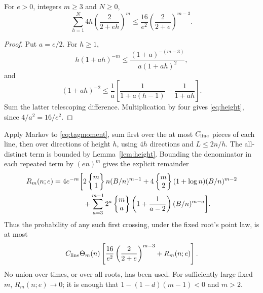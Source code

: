 \begin{lemma}\label{lem:height}
For \(e>0\), integers \(m\ge3\) and \(N\ge0\),
\begin{equation}\label{eq:height}
 \sum_{h=1}^N4h\left(\frac2{2+eh}\right)^m
 \le\frac{16}{e^2}\left(\frac2{2+e}\right)^{m-3}.
\end{equation}
\end{lemma}
\begin{proof}
Put \(a=e/2\). For \(h\ge1\),
\[
 h(1+ah)^{-m}\le\frac{(1+a)^{-(m-3)}}{a(1+ah)^2},
\]
and
\[
 (1+ah)^{-2}\le\frac1a
 \left[\frac1{1+a(h-1)}-\frac1{1+ah}\right].
\]
Sum the latter telescoping difference. Multiplication by four
gives \eqref{eq:height}, since \(4/a^2=16/e^2\).
\end{proof}

Apply Markov to \eqref{eq:tagmoment}, sum first over the at most
\(C_{\rm line}\) pieces of each line, then over directions of
height \(h\), using \(4h\) directions and \(L\le2n/h\).
The all-distinct term is bounded by Lemma~\ref{lem:height}.
Bounding the denominator in each repeated term by \((en)^m\)
gives the explicit remainder
\begin{align}\label{eq:tagremainder}
 R_m(n;e)=4e^{-m}\bigg[&2\left\{\begin{matrix}m\\1\end{matrix}\right\}
                 n(B/n)^{m-1}
 +4\left\{\begin{matrix}m\\2\end{matrix}\right\}
                 (1+\log n)(B/n)^{m-2}\notag\\
 &+\sum_{a=3}^{m-1}2^a
 \left\{\begin{matrix}m\\a\end{matrix}\right\}
 \left(1+\frac1{a-2}\right)(B/n)^{m-a}\bigg].
\end{align}
Thus the probability of any such first crossing, under the fixed
root's point law, is at most
\begin{equation}\label{eq:tagprob}
 C_{\rm line}\Theta_m(n)
 \left[\frac{16}{e^2}\left(\frac2{2+e}\right)^{m-3}
       +R_m(n;e)\right].
\end{equation}
No union over times, or over all roots, has been used.
For sufficiently large fixed \(m\), \(R_m(n;e)\to0\); it is enough
that \(1-(1-d)(m-1)<0\) and \(m>2\).

